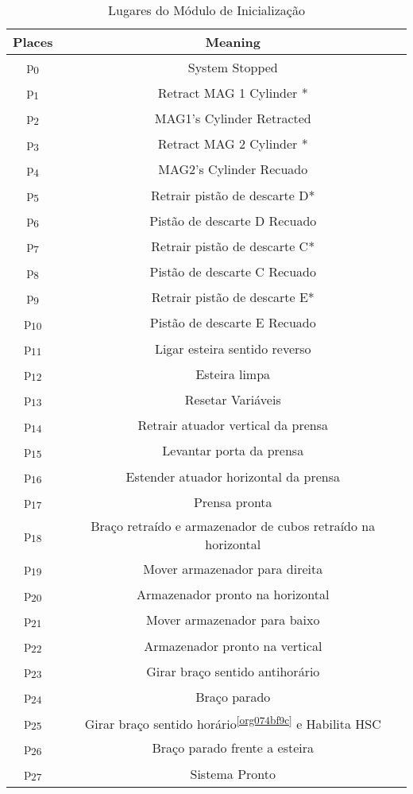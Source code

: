 \begin{table}[htbp]
\caption{Lugares do Módulo de Inicialização}
\centering
\begin{tabular}{c|c}
Places & Meaning\\
\hline
p\textsubscript{0} & System Stopped\\
p\textsubscript{1} & Retract MAG 1 Cylinder *\\
p\textsubscript{2} & MAG1's Cylinder Retracted\\
p\textsubscript{3} & Retract MAG 2 Cylinder *\\
p\textsubscript{4} & MAG2's Cylinder Recuado\\
p\textsubscript{5} & Retrair pistão de descarte D*\\
p\textsubscript{6} & Pistão de descarte D Recuado\\
p\textsubscript{7} & Retrair pistão de descarte C*\\
p\textsubscript{8} & Pistão de descarte C Recuado\\
p\textsubscript{9} & Retrair pistão de descarte E*\\
p\textsubscript{10} & Pistão de descarte E Recuado\\
p\textsubscript{11} & Ligar esteira sentido reverso\\
p\textsubscript{12} & Esteira limpa\\
p\textsubscript{13} & Resetar Variáveis\footnotemark\\
p\textsubscript{14} & Retrair atuador vertical da prensa\\
p\textsubscript{15} & Levantar porta da prensa\\
p\textsubscript{16} & Estender atuador horizontal da prensa\\
p\textsubscript{17} & Prensa pronta\\
p\textsubscript{18} & Braço retraído e armazenador de cubos retraído na horizontal\\
p\textsubscript{19} & Mover armazenador para direita\\
p\textsubscript{20} & Armazenador pronto na horizontal\\
p\textsubscript{21} & Mover armazenador para baixo\\
p\textsubscript{22} & Armazenador pronto na vertical\\
p\textsubscript{23} & Girar braço sentido antihorário\footnotemark\\
p\textsubscript{24} & Braço parado\\
p\textsubscript{25} & Girar braço sentido horário\textsuperscript{\ref{org074bf9c}} e Habilita HSC\\
p\textsubscript{26} & Braço parado frente a esteira\\
p\textsubscript{27} & Sistema Pronto\\
\end{tabular}
\end{table}

